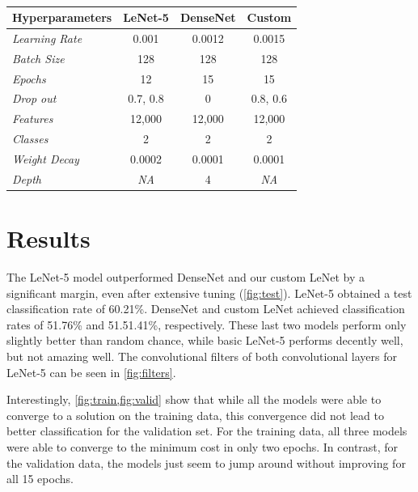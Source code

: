 \documentclass[manuscript,screen,review]{acmart}
\begin{document}
\begin{table}[h!]
\caption{}
  \label{tab:params}
  \begin{tabular}{lccc}
    \textbf{Hyperparameters} & LeNet-5 & DenseNet & Custom \\
    \toprule
    \textit{Learning Rate} & 0.001 & 0.0012 & 0.0015  \\
    \textit{Batch Size} & 128 & 128 & 128\\
    \textit{Epochs} & 12 & 15 & 15 \\
    \textit{Drop out} & 0.7, 0.8 & 0 & 0.8, 0.6 \\
    \textit{Features} & 12,000 & 12,000 & 12,000 \\
    \textit{Classes} & 2 & 2 & 2  \\
    \textit{Weight Decay} & 0.0002 & 0.0001 &  0.0001 \\
    \textit{Depth} & \textit{NA} & 4 & \textit{NA} \\
    \bottomrule
\end{tabular}
\end{table}










\section{Results}

The LeNet-5 model outperformed DenseNet and our custom LeNet by a significant margin, even after extensive tuning (\cref{fig:test}). LeNet-5 obtained a test classification rate of 60.21\%. DenseNet and custom LeNet achieved classification rates of 51.76\% and 51.51.41\%, respectively. These last two models perform only slightly better than random chance, while basic LeNet-5 performs decently well, but not amazing well. The convolutional filters of both convolutional layers for LeNet-5 can be seen in \cref{fig:filters}.
\par
Interestingly, \cref{fig:train,fig:valid} show that while all the models were able to converge to a solution on the training data, this convergence did not lead to better classification for the validation set. For the training data, all three models were able to converge to the minimum cost in only two epochs. In contrast, for the validation data, the models just seem to jump around without improving for all 15 epochs. 
\end{document}
